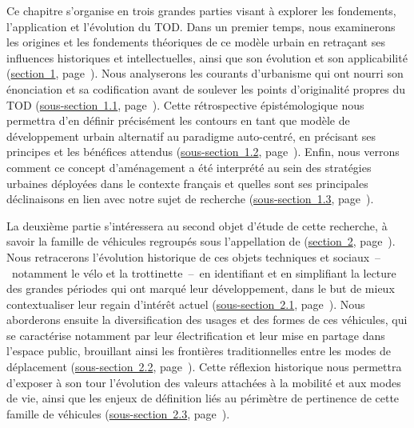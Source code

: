 \begin{refsegment}
Ce chapitre s’organise en trois grandes parties visant à explorer les fondements, l’application et l’évolution du \acrshort{TOD}. Dans un premier temps, nous examinerons les origines et les fondements théoriques de ce modèle urbain en retraçant ses influences historiques et intellectuelles, ainsi que son évolution et son applicabilité (\hyperref[chap1:tod-presentation-generale]{section~1}, page~\pageref{chap1:tod-presentation-generale}). Nous analyserons les courants d’urbanisme qui ont nourri son énonciation et sa codification avant de soulever les points d'originalité propres du \acrshort{TOD} (\hyperref[chap1:tod-presentation-generale-origines]{sous-section~1.1}, page~\pageref{chap1:tod-presentation-generale-origines}). Cette rétrospective épistémologique nous permettra d’en définir précisément les contours en tant que modèle de développement urbain alternatif au paradigme auto-centré, en précisant ses principes et les bénéfices attendus (\hyperref[chap1:tod-presentation-generale-definition]{sous-section~1.2}, page~\pageref{chap1:tod-presentation-generale-definition}). Enfin, nous verrons comment ce concept d'aménagement a été interprété au sein des stratégies urbaines déployées dans le contexte français et quelles sont ses principales déclinaisons en lien avec notre sujet de recherche (\hyperref[chap1:tod-presentation-generale-declinaisons]{sous-section~1.3}, page~\pageref{chap1:tod-presentation-generale-declinaisons}).%

La deuxième partie s’intéressera au second objet d’étude de cette recherche, à savoir la famille de véhicules regroupés sous l’appellation de  (\hyperref[chap1:mobilite-individuelle-legere]{section~2}, page~\pageref{chap1:mobilite-individuelle-legere}). Nous retracerons l’évolution historique de ces objets techniques et sociaux~–~notamment le vélo et la trottinette~–~en identifiant et en simplifiant la lecture des grandes périodes qui ont marqué leur développement, dans le but de mieux contextualiser leur regain d’intérêt actuel (\hyperref[chap1:proximite-velo-trottinette]{sous-section~2.1}, page~\pageref{chap1:proximite-velo-trottinette}). Nous aborderons ensuite la diversification des usages et des formes de ces véhicules, qui se caractérise notamment par leur électrification et leur mise en partage dans l’\gls{espace public}, brouillant ainsi les frontières traditionnelles entre les modes de déplacement (\hyperref[chap1:velo-micromobilite-innovations]{sous-section~2.2}, page~\pageref{chap1:velo-micromobilite-innovations}). Cette réflexion historique nous permettra d’exposer à son tour l'évolution des valeurs attachées à la mobilité et aux modes de vie, ainsi que les enjeux de définition liés au périmètre de pertinence de cette famille de véhicules (\hyperref[chap1:caracterisation-mobilite-individuelle-legere]{sous-section~2.3}, page~\pageref{chap1:caracterisation-mobilite-individuelle-legere}).%


\end{refsegment}
